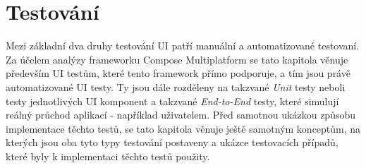 \chapter{Testování} \label{testsSection}


Mezi základní dva druhy testování UI patří manuální a automatizované testovaní. Za účelem analýzy frameworku Compose Multiplatform
se tato kapitola věnuje především UI testům, které tento framework přímo podporuje, a tím jsou právě automatizované UI testy.
Ty jsou dále rozděleny na takzvané \textit{Unit} testy neboli testy jednotlivých UI komponent a takzvané \textit{End-to-End} testy, 
které simulují reálný průchod aplikací - například uživatelem. Před samotnou ukázkou způsobu implementace těchto testů, se tato kapitola
věnuje ještě samotným konceptům, na kterých jsou oba tyto typy testování postaveny a ukázce testovacích případů, které byly k implementaci
těchto testů použity.







